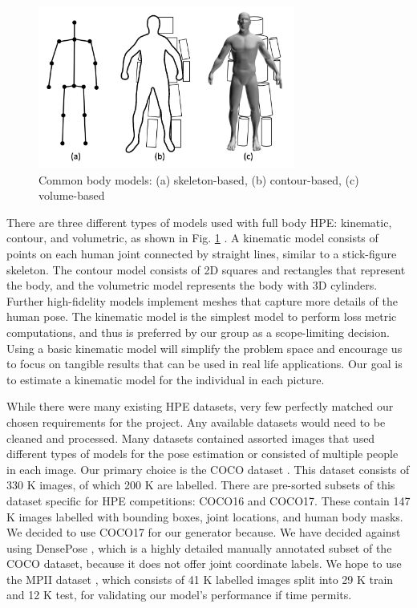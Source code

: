 \documentclass[11pt, letterpaper]{article}
\begin{document}
\begin{figure}
    \centering
    \includegraphics[width=0.75\textwidth]{body_models.png}
    \caption{Common body models: (a) skeleton-based, (b) contour-based, (c) volume-based \cite{Chen_2020}}
    \label{fig:body_model}
\end{figure}

There are three different types of models used with full body HPE: kinematic, contour, and volumetric, as shown in Fig. \ref{fig:body_model} \cite{Chen_2020}. A kinematic model consists of points on each human joint connected by straight lines, similar to a stick-figure skeleton. The contour model consists of 2D squares and rectangles that represent the body, and the volumetric model represents the body with 3D cylinders. Further high-fidelity models implement meshes that capture more details of the human pose. The kinematic model is the simplest model to perform loss metric computations, and thus is preferred by our group as a scope-limiting decision. Using a basic kinematic model will simplify the problem space and encourage us to focus on tangible results that can be used in real life applications. Our goal is to estimate a kinematic model for the individual in each picture.

While there were many existing HPE datasets, very few perfectly matched our chosen requirements for the project. Any available datasets would need to be cleaned and processed. Many datasets contained assorted images that used different types of models for the pose estimation or consisted of multiple people in each image. Our primary choice is the COCO dataset \cite{coco_data}. This dataset consists of 330 K images, of which 200 K are labelled. There are pre-sorted subsets of this dataset specific for HPE competitions: COCO16 and COCO17. These contain 147 K images labelled with bounding boxes, joint locations, and human body masks. We decided to use COCO17 for our generator because. We have decided against using DensePose \cite{densepose}, which is a highly detailed manually annotated subset of the COCO dataset, because it does not offer joint coordinate labels. We hope to use the MPII dataset \cite{mpii}, which consists of 41 K labelled images split into 29 K train and 12 K test, for validating our model’s performance if time permits. 
\end{document}
